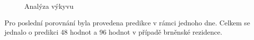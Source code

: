 \documentclass[FM,BP,fonts]{tulthesis}
\begin{document}
\begin{figure}[htbp]
	\centering
	\caption{Analýza výkyvu}
	\label{fig:spike_analysis}
\end{figure}
Pro poslední porovnání byla provedena predikce v rámci jednoho dne. Celkem se jednalo o predikci 48 hodnot a 96 hodnot v případě brněnské rezidence.  
\end{document}
